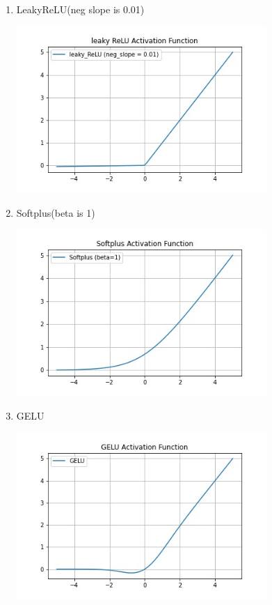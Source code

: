 \documentclass{article}
\begin{document}
\begin{enumerate}
\begin{enumerate}
\begin{tcolorbox}
      \end{tcolorbox}
      \item LeakyReLU(neg slope is 0.01)
      \begin{tcolorbox}
        \includegraphics[width=9.5cm]{leaky_relu.jpg}
      \end{tcolorbox}
      \item Softplus(beta is 1)
      \begin{tcolorbox}
        \includegraphics[width=9.5cm]{softplus.jpg}
      \end{tcolorbox}
      \item GELU
      \begin{tcolorbox}
        \includegraphics[width=9.5cm]{gelu.jpg}

\end{tcolorbox}
\end{enumerate}
\end{enumerate}
\end{document}

